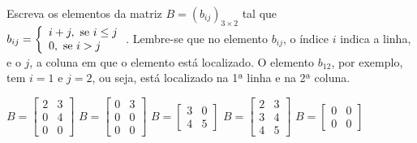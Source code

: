 Escreva os elementos da matriz $B=(b_{ij})_{3\times 2}$ tal que\\$b_{ij}=\left\{ \begin{array}{l}
i+j,\textnormal{ se } i\leq j\\
0,\textnormal{ se } i > j
\end{array} \right.$. Lembre-se que no elemento $b_{ij}$, o índice $i$ indica a linha, e o $j$, a coluna em que o elemento está localizado. O elemento $b_{12}$, por exemplo, tem $i=1$ e $j=2$, ou seja, está localizado na 1ª linha e na 2ª coluna.

$B = \left[ \begin{array}{cc} 2 & 3 \\0 & 4 \\ 0 & 0 \end{array} \right]$
$B = \left[ \begin{array}{cc} 0 & 3 \\0 & 0 \\ 0 & 0 \end{array} \right]$
$B = \left[ \begin{array}{cc} 3 & 0 \\ 4 & 5 \end{array} \right]$
$B = \left[ \begin{array}{cc} 2 & 3 \\3 & 4 \\ 4 & 5 \end{array} \right]$
$B = \left[ \begin{array}{cc} 0 & 0 \\0 & 0 \end{array} \right]$




